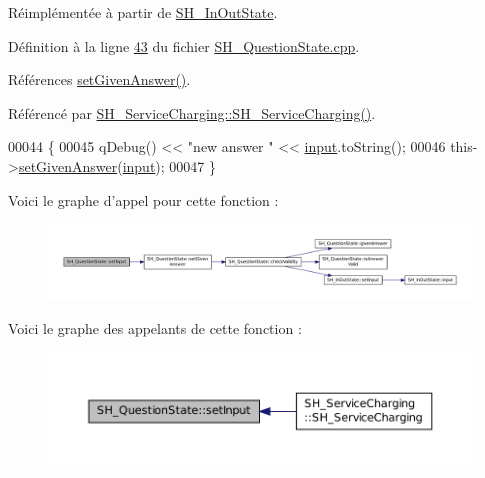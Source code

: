 Réimplémentée à partir de \hyperlink{classSH__InOutState_a0206ab7d5616f28b0da7bfd5451614e8}{S\-H\-\_\-\-In\-Out\-State}.



Définition à la ligne \hyperlink{SH__QuestionState_8cpp_source_l00043}{43} du fichier \hyperlink{SH__QuestionState_8cpp_source}{S\-H\-\_\-\-Question\-State.\-cpp}.



Références \hyperlink{classSH__QuestionState_a9d285a34a7002fd05a7fa8ff9139c264}{set\-Given\-Answer()}.



Référencé par \hyperlink{classSH__ServiceCharging_afa5273d046049b1c2b020a6a19a8290b}{S\-H\-\_\-\-Service\-Charging\-::\-S\-H\-\_\-\-Service\-Charging()}.


\begin{DoxyCode}
00044 \{
00045     qDebug() << \textcolor{stringliteral}{"new answer "} << \hyperlink{classSH__InOutState_a04364c76d2fd8a3781e7b325955e5bd9}{input}.toString();
00046     this->\hyperlink{classSH__QuestionState_a9d285a34a7002fd05a7fa8ff9139c264}{setGivenAnswer}(\hyperlink{classSH__InOutState_a04364c76d2fd8a3781e7b325955e5bd9}{input});
00047 \}
\end{DoxyCode}


Voici le graphe d'appel pour cette fonction \-:\nopagebreak
\begin{figure}[H]
\begin{center}
\leavevmode
\includegraphics[width=350pt]{classSH__QuestionState_a331222d371d9c97392f35c84a5ef43e1_cgraph}
\end{center}
\end{figure}




Voici le graphe des appelants de cette fonction \-:\nopagebreak
\begin{figure}[H]
\begin{center}
\leavevmode
\includegraphics[width=350pt]{classSH__QuestionState_a331222d371d9c97392f35c84a5ef43e1_icgraph}
\end{center}
\end{figure}


